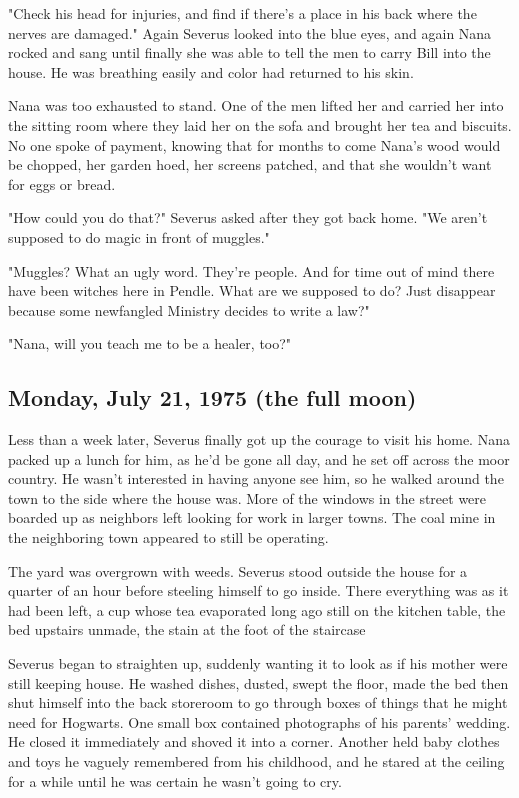 "Check his head for injuries, and find if there's a place in his back where the nerves are damaged." Again Severus looked into the blue eyes, and again Nana rocked and sang until finally she was able to tell the men to carry Bill into the house. He was breathing easily and color had returned to his skin.

Nana was too exhausted to stand. One of the men lifted her and carried her into the sitting room where they laid her on the sofa and brought her tea and biscuits. No one spoke of payment, knowing that for months to come Nana's wood would be chopped, her garden hoed, her screens patched, and that she wouldn't want for eggs or bread.

"How could you do that?" Severus asked after they got back home. "We aren't supposed to do magic in front of muggles."

"Muggles? What an ugly word. They're people. And for time out of mind there have been witches here in Pendle. What are we supposed to do? Just disappear because some newfangled Ministry decides to write a law?"

"Nana, will you teach me to be a healer, too?"

\subsection{Monday, July 21, 1975 (the full moon)}

Less than a week later, Severus finally got up the courage to visit his home. Nana packed up a lunch for him, as he'd be gone all day, and he set off across the moor country. He wasn't interested in having anyone see him, so he walked around the town to the side where the house was. More of the windows in the street were boarded up as neighbors left looking for work in larger towns. The coal mine in the neighboring town appeared to still be operating.

The yard was overgrown with weeds. Severus stood outside the house for a quarter of an hour before steeling himself to go inside. There everything was as it had been left, a cup whose tea evaporated long ago still on the kitchen table, the bed upstairs unmade, the stain at the foot of the staircase{\el}

Severus began to straighten up, suddenly wanting it to look as if his mother were still keeping house. He washed dishes, dusted, swept the floor, made the bed{\el} then shut himself into the back storeroom to go through boxes of things that he might need for Hogwarts. One small box contained photographs of his parents' wedding. He closed it immediately and shoved it into a corner. Another held baby clothes and toys he vaguely remembered from his childhood, and he stared at the ceiling for a while until he was certain he wasn't going to cry.

